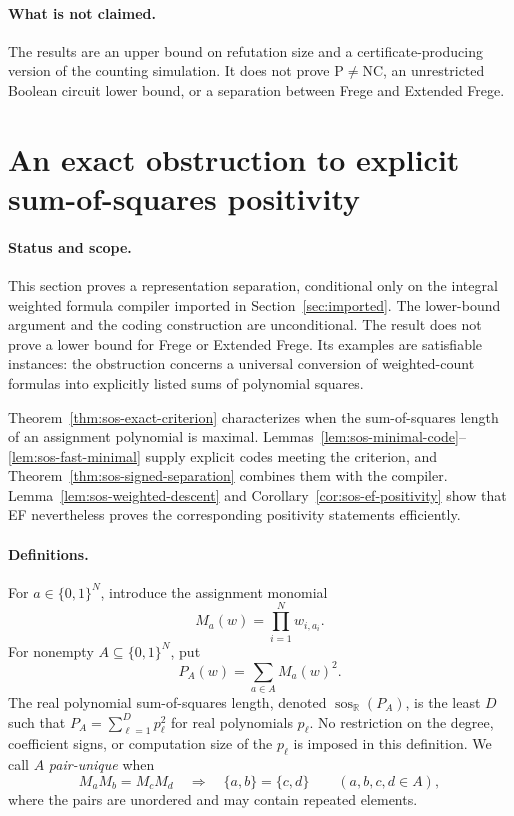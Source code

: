\documentclass[11pt]{article}
\theoremstyle{definition}
\theoremstyle{remark}
\begin{document}
\paragraph{What is not claimed.}
The results are an upper bound on refutation size and a
certificate-producing version of the counting simulation. It
does not prove $\mathrm P\ne\mathrm{NC}$, an unrestricted
Boolean circuit lower bound, or a separation between Frege
and Extended Frege.

\appendix



\section{An exact obstruction to explicit sum-of-squares positivity}
\label{sec:sos-length-obstruction}

\paragraph{Status and scope.}
This section proves a representation separation, conditional only on the
integral weighted formula compiler imported in Section~\ref{sec:imported}.
The lower-bound argument and the coding construction are unconditional.
The result does not prove a lower bound for Frege or Extended Frege.
Its examples are satisfiable instances: the obstruction concerns a
universal conversion of weighted-count formulas into explicitly listed
sums of polynomial squares.

Theorem~\ref{thm:sos-exact-criterion} characterizes when the
sum-of-squares length of an assignment polynomial is maximal.
Lemmas~\ref{lem:sos-minimal-code}--\ref{lem:sos-fast-minimal} supply
explicit codes meeting the criterion, and
Theorem~\ref{thm:sos-signed-separation} combines them with the
compiler. Lemma~\ref{lem:sos-weighted-descent} and
Corollary~\ref{cor:sos-ef-positivity} show that EF nevertheless proves
the corresponding positivity statements efficiently.

\paragraph{Definitions.}
For $a\in\{0,1\}^N$, introduce the assignment monomial
\[
 M_a(w)=\prod_{i=1}^{N}w_{i,a_i}.
\]
For nonempty $A\subseteq\{0,1\}^N$, put
\[
 P_A(w)=\sum_{a\in A}M_a(w)^2.
\]
The real polynomial sum-of-squares length, denoted
$\operatorname{sos}_{\mathbb R}(P_A)$, is the least $D$ such that
$P_A=\sum_{\ell=1}^{D}p_\ell^2$ for real polynomials $p_\ell$.
No restriction on the degree, coefficient signs, or computation size of
the $p_\ell$ is imposed in this definition.
We call $A$ \emph{pair-unique} when
\[
 M_aM_b=M_cM_d\quad\Longrightarrow\quad
 \{a,b\}=\{c,d\}
 \qquad(a,b,c,d\in A),
\]
where the pairs are unordered and may contain repeated elements.
\end{document}
